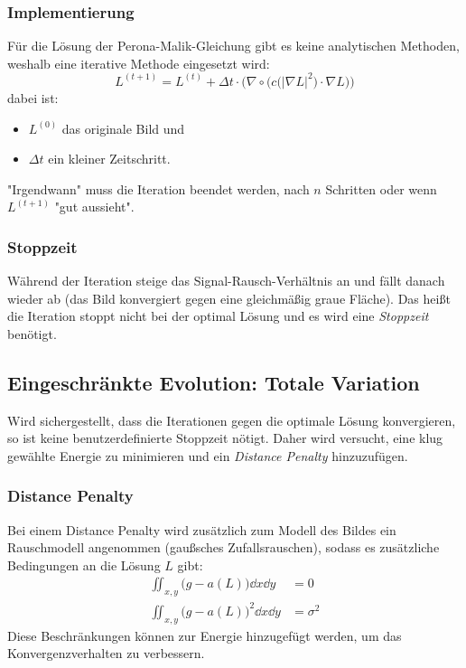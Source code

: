 			\subsubsection{Implementierung}
				Für die Lösung der Perona-Malik-Gleichung gibt es keine analytischen Methoden, weshalb eine iterative Methode eingesetzt wird:
				\begin{equation*}
					L^{(t + 1)} = L^{(t)} + \Delta t \cdot \bigg( \nabla \circ \Big( c\big(\lvert \nabla L \rvert^2\big) \cdot \nabla L \Big) \bigg)
				\end{equation*}
				dabei ist:
				\begin{itemize}
					\item \( L^{(0)} \) das originale Bild und
					\item \( \Delta t \) ein kleiner Zeitschritt.
				\end{itemize}
				"Irgendwann" muss die Iteration beendet werden, \zB nach \(n\) Schritten oder wenn \( L^{(t + 1)} \) "gut aussieht".

			\subsubsection{Stoppzeit}
				Während der Iteration steige das Signal-Rausch-Verhältnis \iA an und fällt danach wieder ab (das Bild konvergiert gegen eine gleichmäßig graue Fläche). Das heißt die Iteration stoppt nicht bei der optimal Lösung und es wird eine \emph{Stoppzeit} benötigt.

		\subsection{Eingeschränkte Evolution: Totale Variation}
			Wird sichergestellt, dass die Iterationen gegen die optimale Lösung konvergieren, so ist keine benutzerdefinierte Stoppzeit nötigt. Daher wird versucht, eine klug gewählte Energie zu minimieren und ein \emph{Distance Penalty} hinzuzufügen.

			\subsubsection{Distance Penalty}
				Bei einem Distance Penalty wird zusätzlich zum Modell des Bildes ein Rauschmodell angenommen (\zB gaußsches Zufallsrauschen), sodass es zusätzliche Bedingungen an die Lösung \(L\) gibt:
				\begin{align*}
					\iint_{x, y} \! \big( g - a(L) \big) \dd{x} \dd{y} &= 0 \\
					\iint_{x, y} \! \big( g - a(L) \big)^2 \dd{x} \dd{y} &= \sigma^2
				\end{align*}
				Diese Beschränkungen können zur Energie hinzugefügt werden, um das Konvergenzverhalten zu verbessern.

